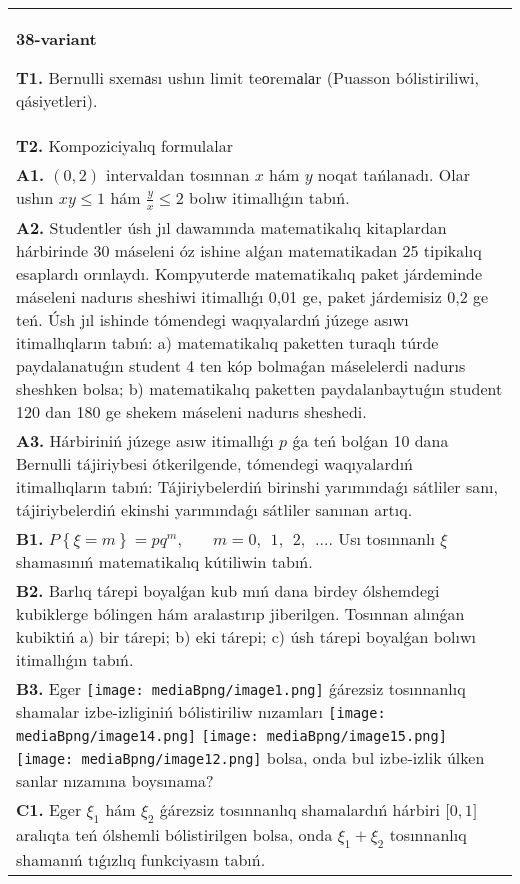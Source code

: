 \documentclass{article}
\begin{document}
\begin{tabular}{m{17cm}}
\textbf{38-variant}
\newline

\textbf{T1.} Bernulli sxemаsı ushın limit teоremаlаr (Puasson bólistiriliwi, qásiyetleri).
 \\
\textbf{T2.} Kompoziciyalıq formulalar \\
\textbf{A1.} $\left( 0,2 \right)$ intervaldan tosınnan $x$ hám $y$ noqat tańlanadı. Olar ushın $xy\le 1$ hám $\frac{y}{x}\le 2$ bolıw itimallıǵın tabıń.
 \\
\textbf{A2.} Studentler úsh jıl dawamında matematikalıq kitaplardan hárbirinde 30 máseleni óz ishine alǵan matematikadan 25 tipikalıq esaplardı orınlaydı. Kompyuterde matematikalıq paket járdeminde máseleni nadurıs sheshiwi itimallıǵı 0,01 ge, paket járdemisiz 0,2 ge teń. Úsh jıl ishinde tómendegi waqıyalardıń júzege asıwı itimallıqların tabıń: a) matematikalıq paketten turaqlı túrde paydalanatuǵın student 4 ten kóp bolmaǵan máselelerdi nadurıs sheshken bolsa; b) matematikalıq paketten paydalanbaytuǵın student 120 dan 180 ge shekem máseleni nadurıs sheshedi.
 \\
\textbf{A3.} Hárbiriniń júzege asıw itimallıǵı $p$ ǵa teń bolǵan 10 dana Bernulli tájiriybesi ótkerilgende, tómendegi waqıyalardıń itimallıqların tabıń: Tájiriybelerdiń birinshi yarımındaǵı sátliler sanı, tájiriybelerdiń ekinshi yarımındaǵı sátliler sanınan artıq.
 \\
\textbf{B1.} \(P\left\{ \xi = m \right\} = pq^{m},\ \ \ \ \ \ \ \ m = 0,\ \ 1,\ \ 2,\ \ \ldots\). Usı tosınnanlı $\xi$ shamasınıń matematikalıq kútiliwin tabıń.
 \\
\textbf{B2.} Barlıq tárepi boyalǵan kub mıń dana birdey ólshemdegi kubiklerge bólingen hám aralastırıp jiberilgen. Tosınnan alınǵan kubiktiń a) bir tárepi; b) eki tárepi; c) úsh tárepi boyalǵan bolıwı itimallıǵın tabıń.
 \\
\textbf{B3.} Eger \texttt{[image: mediaBpng/image1.png]} ǵárezsiz tosınnanlıq shamalar izbe-izliginiń bólistiriliw nızamları
\texttt{[image: mediaBpng/image14.png]} \texttt{[image: mediaBpng/image15.png]} \texttt{[image: mediaBpng/image12.png]}
bolsa, onda bul izbe-izlik úlken sanlar nızamına boysınama?
 \\
\textbf{C1.} Eger \(\xi_{1}\) hám \(\xi_{2}\) ǵárezsiz tosınnanlıq shamalardıń hárbiri \(\lbrack 0,1\rbrack\) aralıqta teń ólshemli bólistirilgen bolsa, onda \(\xi_{1} + \xi_{2}\) tosınnanlıq shamanıń tıǵızlıq funkciyasın tabıń.

\end{tabular}
\end{document}
